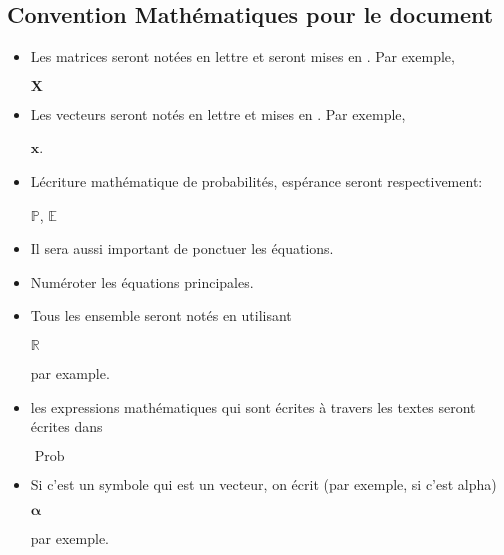 \documentclass[letterpaper,11pt,english]{sphinxmanual}
\begin{document}
\subsection{Convention Mathématiques pour le document}
\label{\detokenize{chapter1:convention-mathematiques-pour-le-document}}\begin{itemize}
\item {} 
\sphinxAtStartPar
Les matrices seront notées en lettre  et seront mises en
. Par exemple,

\sphinxAtStartPar
\(\mathbf{X}\)

\item {} 
\sphinxAtStartPar
Les vecteurs seront notés en lettre  et mises en
. Par exemple,

\sphinxAtStartPar
\(\mathbf{x}\).

\item {} 
\sphinxAtStartPar
Lécriture mathématique de probabilités, espérance seront
respectivement:

\sphinxAtStartPar
\(\mathbb{P}\), \(\mathbb{E}\)

\item {} 
\sphinxAtStartPar
Il sera aussi important de ponctuer les équations.

\item {} 
\sphinxAtStartPar
Numéroter les équations principales.

\item {} 
\sphinxAtStartPar
Tous les ensemble seront notés en utilisant

\sphinxAtStartPar
\(\mathbb{R}\)

\sphinxAtStartPar
par example.

\item {} 
\sphinxAtStartPar
les expressions mathématiques qui sont écrites à travers les textes
seront écrites dans

\sphinxAtStartPar
\(\operatorname{Prob}\)

\item {} 
\sphinxAtStartPar
Si c’est un symbole qui est un vecteur, on écrit (par exemple, si
c’est alpha)

\sphinxAtStartPar
\(\boldsymbol{\alpha}\)

\sphinxAtStartPar
par exemple.

\end{itemize}

\sphinxstepscope
\end{document}
